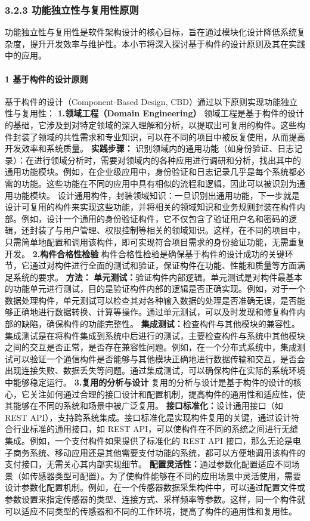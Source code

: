 \subsubsection{3.2.3 功能独立性与复用性原则}\label{ux529fux80fdux72ecux7acbux6027ux4e0eux590dux7528ux6027ux539fux5219}
功能独立性与复用性是软件架构设计的核心目标，旨在通过模块化设计降低系统复杂度，提升开发效率与维护性。本小节将深入探讨基于构件的设计原则及其在实践中的应用。 \paragraph{1
基于构件的设计原则}\label{ux57faux4e8eux6784ux4ef6ux7684ux8bbeux8ba1ux539fux5219} 基于构件的设计（Component-Based Design,
CBD）通过以下原则实现功能独立性与复用性： \textbf{1.领域工程（Domain Engineering）}
领域工程是基于构件的设计的基础，它涉及到对特定领域的深入理解和分析，以提取出可复用的构件。这些构件封装了领域的共性需求和专业知识，可以在不同的项目中被反复使用，从而提高开发效率和系统质量。 \textbf{实践步骤：}
识别领域内的通用功能（如身份验证、日志记录）：在进行领域分析时，需要对领域内的各种应用进行调研和分析，找出其中的通用功能模块。例如，在企业级应用中，身份验证和日志记录几乎是每个系统都必需的功能。这些功能在不同的应用中具有相似的流程和逻辑，因此可以被识别为通用功能模块。
设计通用构件，封装领域知识：一旦识别出通用功能，下一步就是设计可复用的构件来实现这些功能，并将相关的领域知识和业务规则封装在构件内部。例如，设计一个通用的身份验证构件，它不仅包含了验证用户名和密码的逻辑，还封装了与用户管理、权限控制等相关的领域知识。这样，在不同的项目中，只需简单地配置和调用该构件，即可实现符合项目需求的身份验证功能，无需重复开发。
\textbf{2.构件合格性检验} 构件合格性检验是确保基于构件的设计成功的关键环节，它通过对构件进行全面的测试和验证，保证构件在功能、性能和质量等方面满足系统的要求。 \textbf{方法：}
\textbf{单元测试：}验证构件内部逻辑。单元测试是对构件最基本的功能单元进行测试，目的是验证构件内部的逻辑是否正确实现。例如，对于一个数据处理构件，单元测试可以检查其对各种输入数据的处理是否准确无误，是否能够正确地进行数据转换、计算等操作。通过单元测试，可以及时发现和修复构件内部的缺陷，确保构件的功能完整性。
\textbf{集成测试：}检查构件与其他模块的兼容性。集成测试是在将构件集成到系统中后进行的测试，主要检查构件与系统中其他模块之间的交互是否正常，是否存在兼容性问题。例如，在一个分布式系统中，集成测试可以验证一个通信构件是否能够与其他模块正确地进行数据传输和交互，是否会出现连接失败、数据丢失等问题。通过集成测试，可以确保构件在实际的系统环境中能够稳定运行。
\textbf{3.复用的分析与设计} 复用的分析与设计是基于构件的设计的核心，它关注如何通过合理的接口设计和配置机制，提高构件的通用性和适应性，使其能够在不同的系统和场景中被广泛复用。 \textbf{接口标准化：}设计通用接口（如
REST API），支持跨系统集成。接口标准化是实现构件复用的关键，通过设计符合行业标准的通用接口，如 REST API，可以使构件在不同的系统之间进行无缝集成。例如，一个支付构件如果提供了标准化的 REST API
接口，那么无论是电子商务系统、移动应用还是其他需要支付功能的系统，都可以方便地调用该构件的支付接口，无需关心其内部实现细节。
\textbf{配置灵活性：}通过参数化配置适应不同场景（如传感器类型可配置）。为了使构件能够在不同的应用场景中灵活使用，需要设计参数化配置机制。例如，在一个传感器数据采集构件中，可以通过配置文件或参数设置来指定传感器的类型、连接方式、采样频率等参数。这样，同一个构件就可以适应不同类型的传感器和不同的工作环境，提高了构件的通用性和复用性。
